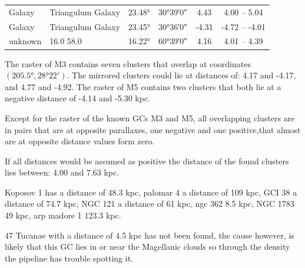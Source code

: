 \begin{table}[H]
\begin{tabular}[t]{l L{2cm} l l c c}
        \addlinespace[2em]
        \midrule[0.5pt]                                                                                                                                            \\
        \midrule[0.5pt]
        Galaxy                           & Triangulum Galaxy        & \ang{23.48}               & \ang{+30;39;0}             & 4.43                   & 4.00 -- 5.04                     \\
        Galaxy                           & Triangulum Galaxy        & \ang{23.45}               & \ang{+30;36;0}             & -4.31                  & -4.72 -- -4.01                   \\
        unknown                          & 16.0 58.0                & \ang{16.22}               & \ang{+60;39;0}             & 4.16                   & 4.01 -- 4.39                     \\

        \midrule
        \bottomrule
    \end{tabular}
\end{table}


The raster of M3 contains seven clusters that overlap at coordinates $ (\ang{205.5}, \ang{28;22;}) $. The mirrored clusters could lie at distances of:
4.17 and -4.17, and 4.77 and -4.92.
The raster of M5 contains two clusters that both lie at a negative distance of -4.14 and -5.30 kpc.

Except for the raster of the known GCs M3 and M5, all overlapping clusters are in pairs that are at opposite parallaxes, one negative and one positive,that almost are at opposite distance values form zero.

If all distances would be assumed as positive the distance of the found clusters lies between: 4.00 and 7.63 kpc.

Koposov 1 has a distance of 48.3 kpc, palomar 4 a distance of 109 kpc, GCI 38 a distance of 74.7 kpc, NGC 121 a distance of 61 kpc, ngc 362 8.5 kpc,  NGC 1783 49 kpc, arp madore 1 123.3 kpc.

47 Tucanae with a distance of 4.5 kpc has not been found, the cause however, is likely that this GC lies in or near the Magellanic clouds so through the density the pipeline has trouble spotting it.



